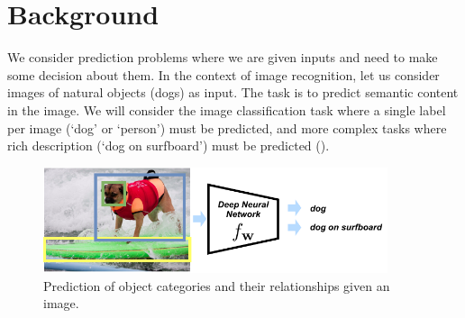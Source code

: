 \graphicspath{{Ch2_background/}}

\chapter{Background\label{sec:bg}}

We consider prediction problems where we are given inputs and need to make some decision about them. In the context of image recognition, let us consider images of natural objects (\eg dogs) as input. The task is to predict semantic content in the image. We will consider the image classification task where a single label per image (\eg `dog' or `person') must be predicted, and more complex tasks where rich description (\eg `dog on surfboard') must be predicted (\fig{\ref{fig:problem}}).%

\begin{figure}[htbp]
    \centering
     \includegraphics[width=0.9\textwidth, align=c]{figs/problem_form.pdf} 
    \caption{Prediction of object categories and their relationships given an image.}
    \label{fig:problem}
\end{figure}


